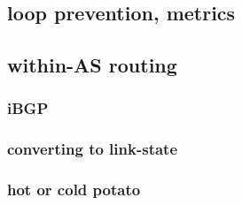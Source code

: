 \subsection{loop prevention, metrics}

\subsection{within-AS routing}

\subsubsection{iBGP}


\subsubsection{converting to link-state}

\subsubsection{hot or cold potato}
